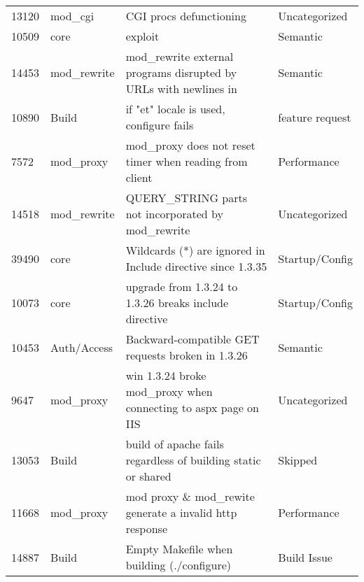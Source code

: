 \begin{longtable}[c]{llll}
13120  & mod\_cgi           & CGI procs defunctioning                                                                                        & Uncategorized     \\
10509  & core               & exploit                                                                                                        & Semantic          \\
14453  & mod\_rewrite       & mod\_rewrite external programs disrupted by URLs with newlines in                                              & Semantic          \\
10890  & Build              & if "et" locale is used, configure fails                                                                        & feature request   \\
7572   & mod\_proxy         & mod\_proxy does not reset timer when reading from client                                                       & Performance       \\
14518  & mod\_rewrite       & QUERY\_STRING parts not incorporated by mod\_rewrite                                                           & Uncategorized     \\
39490  & core               & Wildcards (*) are ignored in Include directive since 1.3.35                                                    & Startup/Config    \\
10073  & core               & upgrade from 1.3.24 to 1.3.26 breaks include directive                                                         & Startup/Config    \\
10453  & Auth/Access        & Backward-compatible GET requests broken in 1.3.26                                                              & Semantic          \\
9647   & mod\_proxy         & win 1.3.24 broke mod\_proxy when connecting to aspx page on IIS                                                & Uncategorized     \\
13053  & Build              & build of apache fails regardless of building static or shared                                                  & Skipped           \\
11668  & mod\_proxy         & mod proxy \& mod\_rewite generate a invalid http response                                                      & Performance       \\
14887  & Build              & Empty Makefile when building (./configure)                                                                     & Build Issue       \\

\end{longtable}
